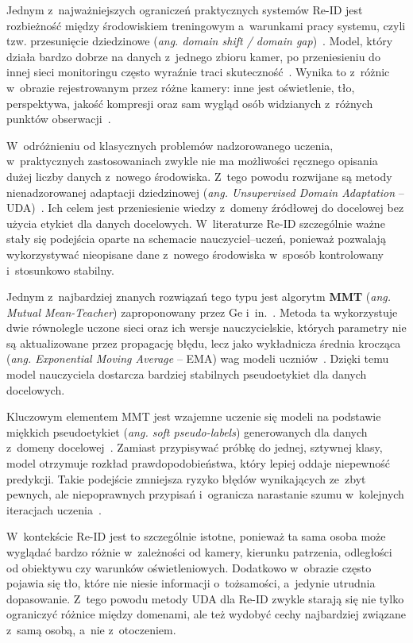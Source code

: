 Jednym z~najważniejszych ograniczeń praktycznych systemów Re-ID jest rozbieżność między
środowiskiem treningowym a~warunkami pracy systemu, czyli tzw. przesunięcie dziedzinowe
(\textit{ang. domain shift / domain gap})~\cite{ristani2016}. Model, który działa bardzo dobrze na
danych z~jednego zbioru kamer, po przeniesieniu do innej sieci monitoringu często wyraźnie traci
skuteczność~\cite{ristani2016, ge2020mutual}. Wynika to z~różnic w~obrazie rejestrowanym przez
różne kamery: inne jest oświetlenie, tło, perspektywa, jakość kompresji oraz sam wygląd osób
widzianych z~różnych punktów obserwacji~\cite{ristani2016, ge2020mutual}.

W~odróżnieniu od klasycznych problemów nadzorowanego uczenia, w~praktycznych zastosowaniach zwykle
nie ma możliwości ręcznego opisania dużej liczby danych z~nowego środowiska. Z~tego powodu
rozwijane są metody nienadzorowanej adaptacji dziedzinowej (\textit{ang. Unsupervised Domain
  Adaptation} -- UDA)~\cite{ge2020mutual}. Ich celem jest przeniesienie wiedzy z~domeny źródłowej do
docelowej bez użycia etykiet dla danych docelowych. W~literaturze Re-ID szczególnie ważne stały się
podejścia oparte na schemacie nauczyciel--uczeń, ponieważ pozwalają wykorzystywać nieopisane dane
z~nowego środowiska w~sposób kontrolowany i~stosunkowo stabilny.

Jednym z~najbardziej znanych rozwiązań tego typu jest algorytm \textbf{MMT} (\textit{ang. Mutual
  Mean-Teacher}) zaproponowany przez Ge i~in.~\cite{ge2020mutual}. Metoda ta wykorzystuje dwie
równolegle uczone sieci oraz ich wersje nauczycielskie, których parametry nie są aktualizowane
przez propagację błędu, lecz jako wykładnicza średnia krocząca (\textit{ang. Exponential Moving
  Average} -- EMA) wag modeli uczniów~\cite{ge2020mutual}. Dzięki temu model nauczyciela dostarcza
bardziej stabilnych pseudoetykiet dla danych docelowych.

Kluczowym elementem MMT jest wzajemne uczenie się modeli na podstawie miękkich pseudoetykiet
(\textit{ang. soft pseudo-labels}) generowanych dla danych z~domeny docelowej~\cite{ge2020mutual}.
Zamiast przypisywać próbkę do jednej, sztywnej klasy, model otrzymuje rozkład prawdopodobieństwa,
który lepiej oddaje niepewność predykcji. Takie podejście zmniejsza ryzyko błędów wynikających
ze~zbyt pewnych, ale niepoprawnych przypisań i~ogranicza narastanie szumu w~kolejnych iteracjach
uczenia~\cite{ge2020mutual}.

W~kontekście Re-ID jest to szczególnie istotne, ponieważ ta sama osoba może wyglądać bardzo różnie
w~zależności od kamery, kierunku patrzenia, odległości od obiektywu czy warunków oświetleniowych.
Dodatkowo w~obrazie często pojawia się tło, które nie niesie informacji o~tożsamości, a~jedynie
utrudnia dopasowanie. Z~tego powodu metody UDA dla Re-ID zwykle starają się nie tylko ograniczyć
różnice między domenami, ale też wydobyć cechy najbardziej związane z~samą osobą, a~nie
z~otoczeniem.

